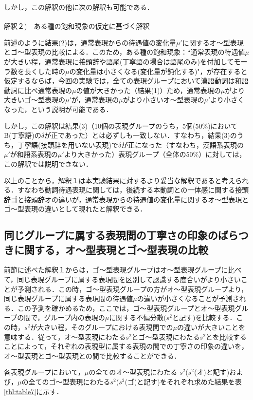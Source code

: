 しかし，この解釈の他に次の解釈も可能である．
\\
\\
解釈２)　ある種の飽和現象の仮定に基づく解釈

前述のように結果(2)は，通常表現からの待遇値の変化量$\mu'$に関するオ〜型表現とゴ〜型表現の比較による．このため，ある種の飽和現象：``通常表現の待遇値$\mu$が大きい程，通常表現に接頭辞や語尾(丁寧語の場合は語尾のみ)を付加してモーラ数を長くした時の$\mu$の変化量は小さくなる(変化量が鈍化する)"，が存在すると仮定するならば，今回の実験では，全ての表現グループにおいて漢語動詞は和語動詞に比べ通常表現の$\mu$の値が大きかった（結果(1)）ため，通常表現の$\mu$がより大きいゴ〜型表現の$\mu'$が，通常表現の$\mu$がより小さいオ〜型表現の$\mu'$より小さくなった，という説明が可能である．

しかし，この解釈は結果(3)（10個の表現グループのうち，5個(50\%)においてB(丁寧語)の$\delta$が正であった）とは必ずしも一致しない．すなわち，結果(3)のうち，丁寧語(接頭辞を用いない表現)で$\delta$が正になった（すなわち，漢語系表現の$\mu'$が和語系表現の$\mu'$より大きかった）表現グループ（全体の50\%）に対しては，この解釈では説明できない．

以上のことから，解釈１は本実験結果に対するより妥当な解釈であると考えられる．すなわち動詞待遇表現に関しては，後続する本動詞との一体感に関する接頭辞ゴと接頭辞オの違いが，通常表現からの待遇値の変化量に関するオ〜型表現とゴ〜型表現の違いとして現れたと解釈できる．

\subsection{同じグループに属する表現間の丁寧さの印象のばらつきに関する，オ〜型表現とゴ〜型表現の比較} \label{sc:5.4}

前節に述べた解釈１からは，ゴ〜型表現グループはオ〜型表現グループに比べて，同じ表現グループに属する表現間を区別して認識する度合いがより小さいことが予測される．この時，ゴ〜型表現グループの方がオ〜型表現グループより，同じ表現グループに属する表現間の待遇値$\mu$の違いが小さくなることが予測される．この予測を確かめるため，ここでは，ゴ〜型表現グループとオ〜型表現グループの間で，グループ内の表現の$\mu$に関する不偏分散($s^{2}$と記す)を比較する．この時，$s^{2}$が大きい程，そのグループにおける表現間での$\mu$の違いが大きいことを意味する．従って，オ〜型表現にわたる$s^{2}$とゴ〜型表現にわたる$s^{2}$とを比較することによって，それぞれの表現型に属する表現の間での丁寧さの印象の違いを，オ〜型表現とゴ〜型表現との間で比較することができる．

各表現グループにおいて，$\mu$の全てのオ〜型表現にわたる $s^{2}$($s^{2}$(オ)と記す)および，$\mu$の全てのゴ〜型表現にわたる$s^{2}$($s^{2}$(ゴ)と記す)をそれぞれ求めた結果を表\ref{tbl:table7}に示す．


